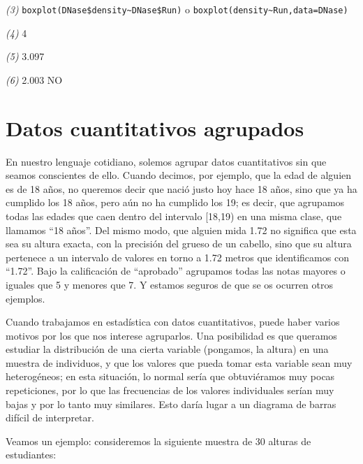 \documentclass[]{book}
\theoremstyle{definition}
\theoremstyle{definition}
\theoremstyle{definition}
\theoremstyle{remark}
\begin{document}
\emph{(3)} \texttt{boxplot(DNase\$density\textasciitilde{}DNase\$Run)} o \texttt{boxplot(density\textasciitilde{}Run,data=DNase)}

\emph{(4)} 4

\emph{(5)} 3.097

\emph{(6)} 2.003 NO

\hypertarget{datos-cuantitativos-agrupados}{%
\chapter{Datos cuantitativos agrupados}\label{datos-cuantitativos-agrupados}}

En nuestro lenguaje cotidiano, solemos agrupar datos cuantitativos sin que seamos conscientes de ello. Cuando decimos, por ejemplo, que la edad de alguien es de 18 años, no queremos decir que nació justo hoy hace 18 años, sino que ya ha cumplido los 18 años, pero aún no ha cumplido los 19; es decir, que agrupamos todas las edades que caen dentro del intervalo {[}18,19) en una misma clase, que llamamos ``18 años''. Del mismo modo, que alguien mida 1.72 no significa que esta sea su altura exacta, con la precisión del grueso de un cabello, sino que su altura pertenece a un intervalo de valores en torno a 1.72 metros que identificamos con ``1.72''. Bajo la calificación de ``aprobado'' agrupamos todas las notas mayores o iguales que 5 y menores que 7. Y estamos seguros de que se os ocurren otros ejemplos.

Cuando trabajamos en estadística con datos cuantitativos, puede haber varios motivos por los que nos interese agruparlos. Una posibilidad es que queramos estudiar la distribución de una cierta variable (pongamos, la altura) en una muestra de individuos, y que los valores que pueda tomar esta variable sean muy heterogéneos; en esta situación, lo normal sería que obtuviéramos muy pocas repeticiones, por lo que las frecuencias de los valores individuales serían muy bajas y por lo tanto muy similares. Esto daría lugar a un diagrama de barras difícil de interpretar.

Veamos un ejemplo: consideremos la siguiente muestra de 30 alturas de estudiantes:
\end{document}
